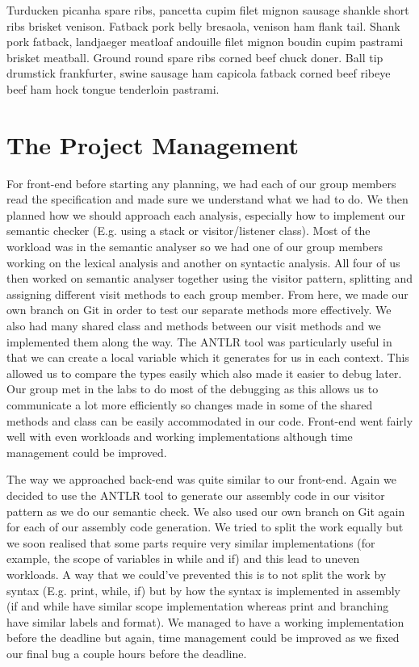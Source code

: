 \documentclass[11pt]{article}
\begin{document}
\medskip

Turducken picanha spare ribs, pancetta cupim filet mignon sausage shankle short ribs brisket venison. Fatback pork belly bresaola, venison ham flank tail. Shank pork fatback, landjaeger meatloaf andouille filet mignon boudin cupim pastrami brisket meatball. Ground round spare ribs corned beef chuck doner. Ball tip drumstick frankfurter, swine sausage ham capicola fatback corned beef ribeye beef ham hock tongue tenderloin pastrami.

\section{The Project Management}

For front-end before starting any planning, we had each of our group members read the specification and made sure we understand what we had to do. We then planned how we should approach each analysis, especially how to implement our semantic checker (E.g. using a stack or visitor/listener class). Most of the workload was in the semantic analyser so we had one of our group members working on the lexical analysis and another on syntactic analysis. All four of us then worked on semantic analyser together using the visitor pattern, splitting and assigning different visit methods to each group member. From here, we made our own branch on Git in order to test our separate methods more effectively. We also had many shared class and methods between our visit methods and we implemented them along the way. The ANTLR tool was particularly useful in that we can create a local variable which it generates for us in each context. This allowed us to compare the types easily which also made it easier to debug later. Our group met in the labs to do most of the debugging as this allows us to communicate a lot more efficiently so changes made in some of the shared methods and class can be easily accommodated in our code. Front-end went fairly well with even workloads and working implementations although time management could be improved.

\medskip

The way we approached back-end was quite similar to our front-end. Again we decided to use the ANTLR tool to generate our assembly code in our visitor pattern as we do our semantic check. We also used our own branch on Git again for each of our assembly code generation. We tried to split the work equally but we soon realised that some parts require very similar implementations (for example, the scope of variables in while and if) and this lead to uneven workloads. A way that we could’ve prevented this is to not split the work by syntax (E.g. print, while, if) but by how the syntax is implemented in assembly (if and while have similar scope implementation whereas print and branching have similar labels and format). We managed to have a working implementation before the deadline but again, time management could be improved as we fixed our final bug a couple hours before the deadline.
\end{document}

